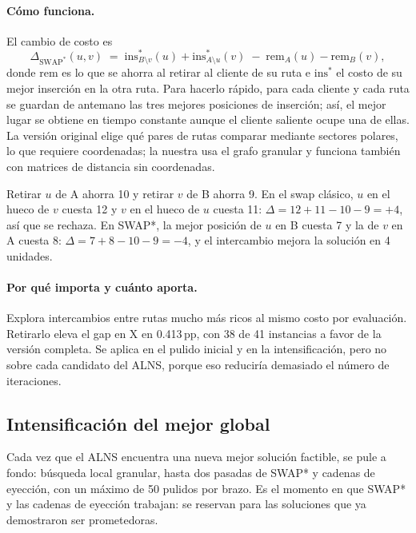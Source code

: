 \documentclass[11pt,a4paper]{article}
\newcommand{\pp}{\,pp}
\begin{document}
\paragraph{Cómo funciona.} El cambio de costo es
\begin{equation}
\Delta_{\mathrm{SWAP^{*}}}(u,v) \;=\; \mathrm{ins}^{*}_{B\setminus v}(u)+\mathrm{ins}^{*}_{A\setminus u}(v)
\;-\;\mathrm{rem}_{A}(u)-\mathrm{rem}_{B}(v),
\label{eq:swapstar}
\end{equation}
donde $\mathrm{rem}$ es lo que se ahorra al retirar al cliente de su ruta e $\mathrm{ins}^*$ el costo
de su mejor inserción en la otra ruta. Para hacerlo rápido, para cada cliente y cada ruta se guardan
de antemano las tres mejores posiciones de inserción; así, el mejor lugar se obtiene en tiempo
constante aunque el cliente saliente ocupe una de ellas. La versión original elige qué pares de rutas
comparar mediante sectores polares, lo que requiere coordenadas; la nuestra usa el grafo granular y
funciona también con matrices de distancia sin coordenadas.

\begin{ejemplo}
Retirar $u$ de A ahorra 10 y retirar $v$ de B ahorra 9. En el swap clásico, $u$ en el hueco de $v$
cuesta 12 y $v$ en el hueco de $u$ cuesta 11: $\Delta=12+11-10-9=+4$, así que se rechaza. En SWAP*,
la mejor posición de $u$ en B cuesta 7 y la de $v$ en A cuesta 8: $\Delta=7+8-10-9=-4$, y el
intercambio mejora la solución en 4 unidades.
\end{ejemplo}

\paragraph{Por qué importa y cuánto aporta.} Explora intercambios entre rutas mucho más ricos al mismo
costo por evaluación. Retirarlo eleva el gap en X en 0.413\pp{}, con 38 de 41 instancias a favor de la
versión completa. Se aplica en el pulido inicial y en la intensificación, pero no sobre cada
candidato del ALNS, porque eso reduciría demasiado el número de iteraciones.

\subsection{Intensificación del mejor global}
Cada vez que el ALNS encuentra una nueva mejor solución factible, se pule a fondo: búsqueda local
granular, hasta dos pasadas de SWAP* y cadenas de eyección, con un máximo de 50 pulidos por brazo.
Es el momento en que SWAP* y las cadenas de eyección trabajan: se reservan para las soluciones que ya
demostraron ser prometedoras.
\end{document}
